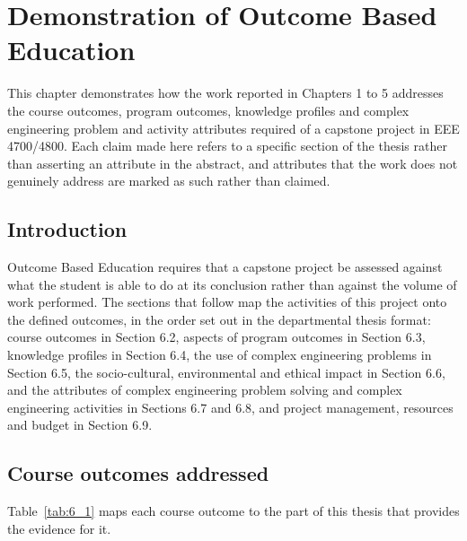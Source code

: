 \chapter{Demonstration of Outcome Based Education}\label{ch:6}

This chapter demonstrates how the work reported in Chapters 1 to 5 addresses the course outcomes, program outcomes, knowledge profiles and complex engineering problem and activity attributes required of a capstone project in EEE 4700/4800. Each claim made here refers to a specific section of the thesis rather than asserting an attribute in the abstract, and attributes that the work does not genuinely address are marked as such rather than claimed.


\section{Introduction}
\label{sec:6_1}

Outcome Based Education requires that a capstone project be assessed against what the student is able to do at its conclusion rather than against the volume of work performed. The sections that follow map the activities of this project onto the defined outcomes, in the order set out in the departmental thesis format: course outcomes in Section 6.2, aspects of program outcomes in Section 6.3, knowledge profiles in Section 6.4, the use of complex engineering problems in Section 6.5, the socio-cultural, environmental and ethical impact in Section 6.6, and the attributes of complex engineering problem solving and complex engineering activities in Sections 6.7 and 6.8, and project management, resources and budget in Section 6.9.


\section{Course outcomes addressed}
\label{sec:6_2}

Table~\ref{tab:6_1} maps each course outcome to the part of this thesis that provides the evidence for it.



